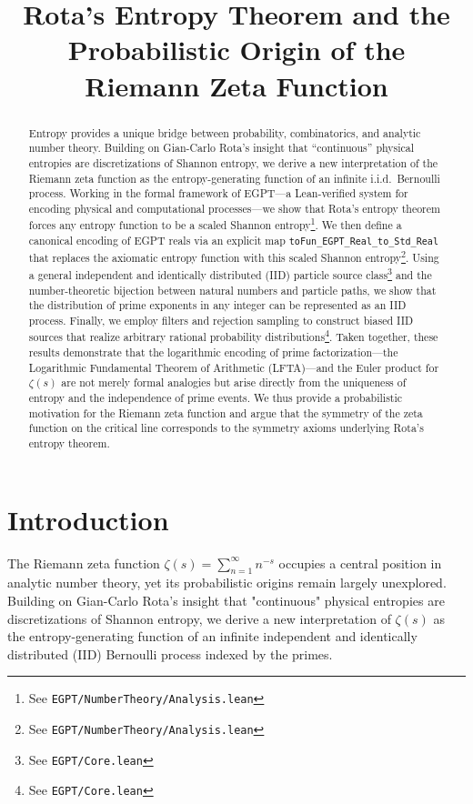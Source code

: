 \documentclass[12pt]{article}
\begin{document}
\title{Rota’s Entropy Theorem and the Probabilistic Origin of the Riemann Zeta Function}
\author{}
\date{}
\maketitle

\begin{abstract}
Entropy provides a unique bridge between probability, combinatorics, and analytic number theory.  Building on Gian-Carlo Rota’s insight that “continuous” physical entropies are discretizations of Shannon entropy, we derive a new interpretation of the Riemann zeta function as the entropy-generating function of an infinite i.i.d.\ Bernoulli process.  Working in the formal framework of EGPT—a Lean-verified system for encoding physical and computational processes—we show that Rota's entropy theorem forces any entropy function to be a scaled Shannon entropy\footnote{See \texttt{EGPT/NumberTheory/Analysis.lean}}.  We then define a canonical encoding of EGPT reals via an explicit map \texttt{toFun\_EGPT\_Real\_to\_Std\_Real} that replaces the axiomatic entropy function with this scaled Shannon entropy\footnote{See \texttt{EGPT/NumberTheory/Analysis.lean}}.  Using a general independent and identically distributed (IID) particle source class\footnote{See \texttt{EGPT/Core.lean}} and the number-theoretic bijection between natural numbers and particle paths, we show that the distribution of prime exponents in any integer can be represented as an IID process.  Finally, we employ filters and rejection sampling to construct biased IID sources that realize arbitrary rational probability distributions\footnote{See \texttt{EGPT/Core.lean}}.  Taken together, these results demonstrate that the logarithmic encoding of prime factorization—the Logarithmic Fundamental Theorem of Arithmetic (LFTA)—and the Euler product for $\zeta(s)$ are not merely formal analogies but arise directly from the uniqueness of entropy and the independence of prime events.  We thus provide a probabilistic motivation for the Riemann zeta function and argue that the symmetry of the zeta function on the critical line corresponds to the symmetry axioms underlying Rota’s entropy theorem.
\end{abstract}

\section{Introduction}

The Riemann zeta function $\zeta(s) = \sum_{n=1}^{\infty} n^{-s}$ occupies a central position in analytic number theory, yet its probabilistic origins remain largely unexplored. Building on Gian-Carlo Rota's insight that "continuous" physical entropies are discretizations of Shannon entropy, we derive a new interpretation of $\zeta(s)$ as the entropy-generating function of an infinite independent and identically distributed (IID) Bernoulli process indexed by the primes.
\end{document}
